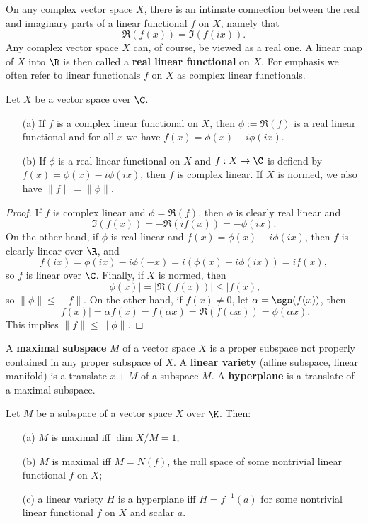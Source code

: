 On any complex vector space $X$, there is an intimate connection between the real and imaginary parts of a linear functional $f$ on $X$, namely that
\[\Re(f(x))=\Im(f(ix)).\]
Any complex vector space $X$ can, of course, be viewed as a real one. A linear map of $X$ into $\R$ is then called a \textbf{real linear functional} on $X$. For emphasis we often refer to linear functionals $f$ on $X$ as complex linear functionals.
\begin{proposition}\label{linear functional real and complex}
Let $X$ be a vector space over $\C$.
\begin{itemize}
\item[(a)] If $f$ is a complex linear functional on $X$, then $\phi:=\Re(f)$ is a real linear functional and for all $x$ we have $f(x)=\phi(x)-i\phi(ix)$.
\item[(b)] If $\phi$ is a real linear functional on $X$ and $f:X\to\C$ is defiend by $f(x)=\phi(x)-i\phi(ix)$, then $f$ is complex linear. If $X$ is normed, we also have $\|f\|=\|\phi\|$.
\end{itemize}
\end{proposition}
\begin{proof}
If $f$ is complex linear and $\phi=\Re(f)$, then $\phi$ is clearly real linear and
\[\Im(f(x))=-\Re(if(x))=-\phi(ix).\]
On the other hand, if $\phi$ is real linear and $f(x)=\phi(x)-i\phi(ix)$, then $f$ is clearly linear over $\R$, and
\[f(ix)=\phi(ix)-i\phi(-x)=i(\phi(x)-i\phi(ix))=if(x),\]
so $f$ is linear over $\C$. Finally, if $X$ is normed, then
\[|\phi(x)|=|\Re(f(x))|\leq|f(x),\]
so $\|\phi\|\leq\|f\|$. On the other hand, if $f(x)\neq 0$, let $\alpha=\sgn(f(x))$, then
\[|f(x)|=\alpha f(x)=f(\alpha x)=\Re(f(\alpha x))=\phi(\alpha x).\]
This implies $\|f\|\leq\|\phi\|$.
\end{proof}
A \textbf{maximal subspace} $M$ of a vector space $X$ is a proper subspace not properly contained in any proper subspace of $X$. A \textbf{linear variety} (affine subspace, linear manifold) is a translate $x+M$ of a subspace $M$. A \textbf{hyperplane} is a translate of a maximal subspace.
\begin{proposition}\label{linear functional and hyperplane}
Let $M$ be a subspace of a vector space $X$ over $\K$. Then:
\begin{itemize}
\item[(a)] $M$ is maximal iff $\dim X/M=1$;
\item[(b)] $M$ is maximal iff $M=N(f)$, the null space of some nontrivial linear functional $f$ on $X$;
\item[(c)] a linear variety $H$ is a hyperplane iff $H=f^{-1}(a)$ for some
nontrivial linear functional $f$ on $X$ and scalar $a$.
\end{itemize}
\end{proposition}
